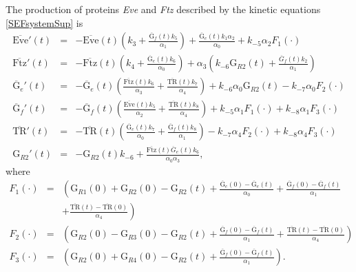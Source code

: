 \documentclass[final,authoryear, 5p, times]{elsarticle}
\begin{document}
The production of proteins \textit{Eve} and  \textit{Ftz}  described by the kinetic equations \eqref{SEFsystemSup} is
$$
\begin{array}{lcl}
 \overline{\text{Eve}}'(t)&=& -\overline{\text{Eve}}(t) \left(k_3 + \frac{\overline{\text{G}}_f (t) k_5}{\alpha_1}\right) + \frac{\overline{\text{G}}_e (t) k_1 \alpha_2}{\alpha_0} + k_{-5}\alpha_2 F_1(\cdot) \\[5pt]
 \overline{\text{Ftz}}'(t)&=& - \overline{\text{Ftz}}(t) \left(k_4 + \frac{\overline{\text{G}}_e (t) k_6}{\alpha_0} \right) + \alpha_3 \left( k_{-6} \text{G}_{R2}(t) + \frac{\overline{G}_f(t) k_2}{\alpha_1} \right)\\[5pt]
  \overline{\text{G}}_e'(t)&=& -\overline{\text{G}}_e(t) \left( \frac{\overline{\text{Ftz}}(t) k_6}{\alpha_3} + \frac{\overline{\text{TR}}(t)k_7}{\alpha_4} \right) + k_{-6}\alpha_0 \text{G}_{R2}(t) - k_{-7}\alpha_0 F_2(\cdot)\\[5pt]
 \overline{\text{G}}_f'(t)&=& -\overline{\text{G}}_f(t) \left(\frac{\overline{\text{Eve}}(t) k_5}{\alpha_2} +\frac{\overline{\text{TR}}(t) k_8}{\alpha_4}\right) + k_{-5} \alpha_1 F_1(\cdot) + k_{-8} \alpha_1 F_3(\cdot)\\[5pt]
 \overline{\text{TR}}'(t)&=& - \overline{\text{TR}}(t) \left(\frac{\overline{\text{G}}_e(t) k_{7}}{\alpha_0} + \frac{\overline{\text{G}}_f(t) k_8}{\alpha_1}\right) -k_{-7} \alpha_4 F_2(\cdot)+ k_{-8} \alpha_4 F_3(\cdot)\\[5pt]
 \text{G}_{R2}'(t)&=& -\text{G}_{R2}(t) k_{-6} + \frac{\overline{\text{Ftz}}(t)\overline{G}_e(t) k_6}{\alpha_0 \alpha_3},
\end{array}
$$
where
\scriptsize{$$
\begin{array}{lcl}
F_1(\cdot)&=& \left(\text{G}_{R1}(0) + \text{G}_{R2}(0)-\text{G}_{R2}(t) + \frac{\overline{\text{G}}_e(0) - \overline{\text{G}}_e(t)}{\alpha_0} + \frac{\overline{\text{G}}_f(0) - \overline{\text{G}}_f(t)}{\alpha_1}\right. \\&&+ \left. \frac{\overline{\text{TR}}(t) - \overline{\text{TR}}(0)}{\alpha_4} \right)\\[5pt]
F_2(\cdot)&=& \left(\text{G}_{R2}(0) - \text{G}_{R3}(0)-\text{G}_{R2}(t) + \frac{\overline{\text{G}}_f(0) - \overline{\text{G}}_f(t)}{\alpha_1} + \frac{\overline{\text{TR}}(t) - \overline{\text{TR}}(0)}{\alpha_4} \right)\\ [5pt]
F_3(\cdot)&=& \left(\text{G}_{R2}(0) + \text{G}_{R4}(0)-\text{G}_{R2}(t) + \frac{\overline{\text{G}}_f(0) - \overline{\text{G}}_f(t)}{\alpha_1} \right).
\end{array} 
$$}
\end{document}
